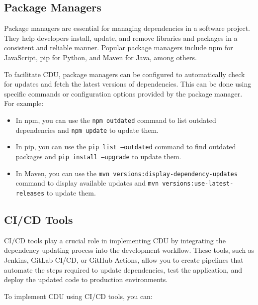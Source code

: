 \documentclass[10pt]{article}
\begin{document}
\subsection*{Package Managers}

Package managers are essential for managing dependencies in a software project. They help developers install, update, and remove libraries and packages in a consistent and reliable manner. Popular package managers include npm for JavaScript, pip for Python, and Maven for Java, among others.

To facilitate CDU, package managers can be configured to automatically check for updates and fetch the latest versions of dependencies. This can be done using specific commands or configuration options provided by the package manager. For example:

\begin{itemize}

  \item In npm, you can use the \texttt{npm outdated} command to list outdated dependencies and \texttt{npm update} to update them.

  \item In pip, you can use the \texttt{pip list --outdated} command to find outdated packages and \texttt{pip install --upgrade} to update them.

  \item In Maven, you can use the \texttt{mvn versions:display-dependency-updates} command to display available updates and \texttt{mvn versions:use-latest-releases} to update them.

\end{itemize}

\subsection*{CI/CD Tools}

CI/CD tools play a crucial role in implementing CDU by integrating the dependency updating process into the development workflow. These tools, such as Jenkins, GitLab CI/CD, or GitHub Actions, allow you to create pipelines that automate the steps required to update dependencies, test the application, and deploy the updated code to production environments.

To implement CDU using CI/CD tools, you can:
\end{document}
